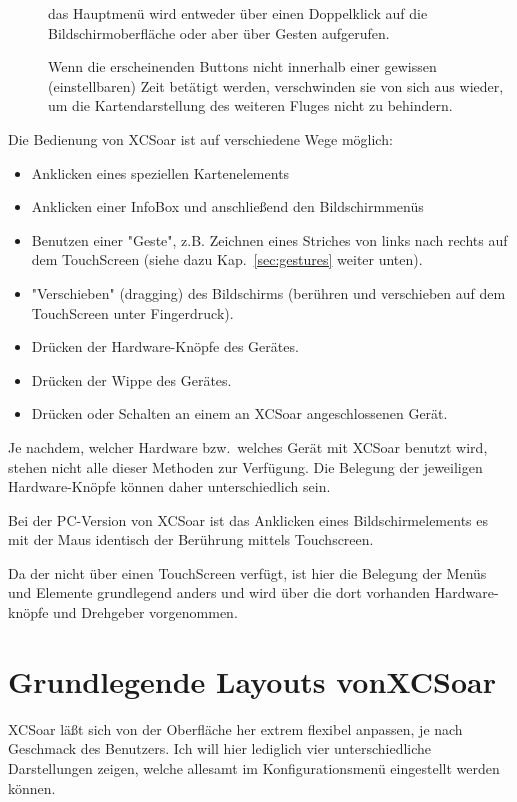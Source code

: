 \begin{description}
\item[] das Hauptmenü wird entweder über einen Doppelklick auf die Bildschirmoberfläche oder aber über Gesten  aufgerufen.

   Wenn die erscheinenden Buttons nicht innerhalb einer gewissen (einstellbaren) Zeit  betätigt  werden, verschwinden sie von sich aus wieder, um die Kartendarstellung des weiteren Fluges nicht zu behindern.
\end{description}

Die Bedienung von \textsf{XCSoar} ist auf verschiedene Wege möglich:

\begin{itemize}
\item Anklicken eines speziellen Kartenelements
\item Anklicken einer InfoBox und anschließend den Bildschirmmenüs
\item Benutzen einer "Geste", z.B. Zeichnen eines Striches von links nach rechts auf dem TouchScreen
 (siehe dazu Kap.~\ref{sec:gestures} weiter unten).
\item "Verschieben" (dragging) des Bildschirms (berühren und verschieben auf dem TouchScreen unter Fingerdruck).
\item Drücken der Hardware-Knöpfe des  Gerätes.
\item Drücken der Wippe des Gerätes.
\item Drücken  oder Schalten  an einem an \textsf{XCSoar} angeschlossenen Gerät.
\end{itemize}

Je nachdem, welcher Hardware bzw.\ welches Gerät mit \textsf{XCSoar}  benutzt wird, stehen nicht alle dieser Methoden zur Verfügung. Die Belegung der jeweiligen Hardware-Knöpfe können daher unterschiedlich sein.

Bei der \textsf{PC}-Version von \textsf{XCSoar} ist das Anklicken eines Bildschirmelements es mit der Maus identisch der Berührung mittels Touchscreen.

Da der \al nicht über einen TouchScreen verfügt, ist hier die Belegung der Menüs und Elemente grundlegend anders und wird über die dort vorhanden Hardware-knöpfe und Drehgeber vorgenommen.

 \newpage
 \section{Grundlegende Layouts von\textsf{XCSoar}}
 \textsf{XCSoar} läßt sich von der Oberfläche her extrem flexibel anpassen, je nach Geschmack des Benutzers. 
 Ich will hier lediglich vier unterschiedliche Darstellungen zeigen, welche allesamt im Konfigurationsmenü eingestellt werden können. 


